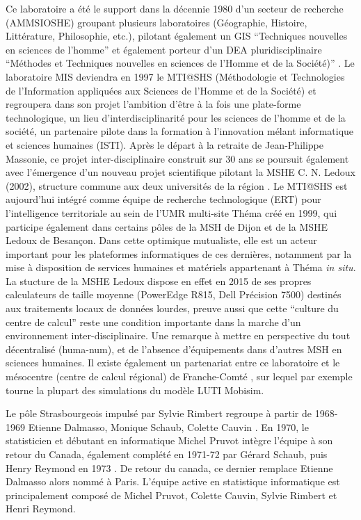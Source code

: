 Ce laboratoire a été le support dans la décennie 1980 d'un secteur de recherche (AMMSIOSHE) groupant plusieurs laboratoires (Géographie, Histoire, Littérature, Philosophie, etc.), pilotant également un GIS \enquote{Techniques nouvelles en sciences de l'homme} et également porteur d'un DEA pluridisciplinaire \enquote{Méthodes et Techniques nouvelles en sciences de l'Homme et de la Société)} \autocite{TSH1984}. Le laboratoire MIS deviendra en 1997 le MTI@SHS (Méthodologie et Technologies de l'Information appliquées aux Sciences de l'Homme et de la Société) \autocite{Girardot2004} et regroupera dans son projet l'ambition d'être à la fois une plate-forme technologique, un lieu d'interdisciplinarité pour les sciences de l'homme et de la société, un partenaire pilote dans la formation à l'innovation mélant informatique et sciences humaines (ISTI). Après le départ à la retraite de Jean-Philippe Massonie, ce projet inter-disciplinaire construit sur 30 ans se poursuit également avec l'émergence d'un nouveau projet scientifique pilotant la MSHE C. N. Ledoux (2002), structure commune aux deux universités de la région \autocites{Favory2003, Favory2009}. Le MTI@SHS est aujourd'hui intégré comme équipe de recherche technologique (ERT) pour l'intelligence territoriale au sein de l'UMR multi-site Théma créé en 1999, qui participe également dans certains pôles de la MSH de Dijon et de la MSHE Ledoux de Besançon. Dans cette optimique mutualiste, elle est un acteur important pour les plateformes informatiques de ces dernières, notamment par la mise à disposition de services humaines et matériels appartenant à Théma \textit{in situ}. La stucture de la MSHE Ledoux dispose en effet en 2015 de ses propres calculateurs de taille moyenne (PowerEdge R815, Dell Précision 7500) destinés aux traitements locaux de données lourdes, preuve aussi que cette \enquote{culture du centre de calcul} reste une condition importante dans la marche d'un environnement inter-disciplinaire. Une remarque à mettre en perspective du tout décentralisé (huma-num), et de l'absence d'équipements dans d'autres MSH en sciences humaines. Il existe également un partenariat entre ce laboratoire et le mésocentre (centre de calcul régional) de Franche-Comté \autocite{Asch2012}, sur lequel par exemple tourne la plupart des simulations du modèle LUTI Mobisim.\autocites{Thema2010, Hirtzel2015}

Le pôle Strasbourgeois impulsé par Sylvie Rimbert regroupe à partir de 1968-1969 Etienne Dalmasso, Monique Schaub, Colette Cauvin . En 1970, le statisticien et débutant en informatique Michel Pruvot intègre l'équipe à son retour du Canada, également complété en 1971-72 par Gérard Schaub, puis Henry Reymond en 1973 \autocite[135-153]{Cuyala2014}. De retour du canada, ce dernier remplace Etienne Dalmasso alors nommé à Paris. L'équipe active en statistique informatique est principalement composé de Michel Pruvot, Colette Cauvin, Sylvie Rimbert et Henri Reymond.

